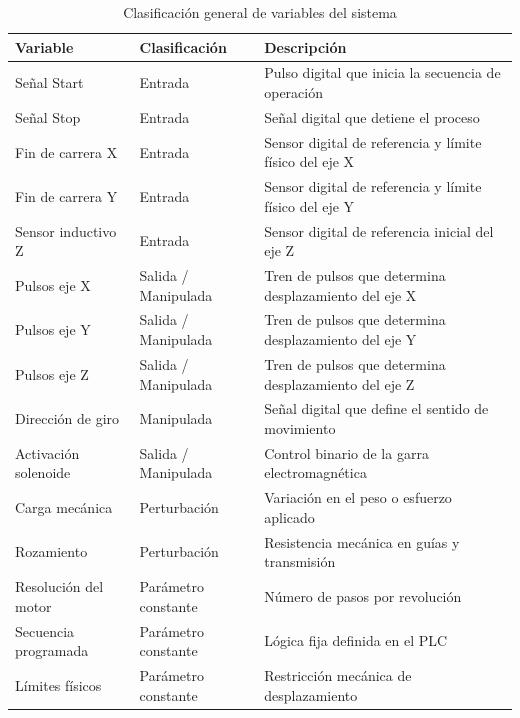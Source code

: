 \documentclass[a4paper,12pt]{article}
\begin{document}
\begin{table}[H]
\centering
\renewcommand{\arraystretch}{1.3}
\begin{tabular}{p{4cm} p{3cm} p{6cm}}
\toprule
\textbf{Variable} & \textbf{Clasificación} & \textbf{Descripción} \\
\midrule

Señal Start & Entrada & Pulso digital que inicia la secuencia de operación \\

Señal Stop & Entrada & Señal digital que detiene el proceso \\

Fin de carrera X & Entrada & Sensor digital de referencia y límite físico del eje X \\

Fin de carrera Y & Entrada & Sensor digital de referencia y límite físico del eje Y \\

Sensor inductivo Z & Entrada & Sensor digital de referencia inicial del eje Z \\

Pulsos eje X & Salida / Manipulada & Tren de pulsos que determina desplazamiento del eje X \\

Pulsos eje Y & Salida / Manipulada & Tren de pulsos que determina desplazamiento del eje Y \\

Pulsos eje Z & Salida / Manipulada & Tren de pulsos que determina desplazamiento del eje Z \\

Dirección de giro & Manipulada & Señal digital que define el sentido de movimiento \\

Activación solenoide & Salida / Manipulada & Control binario de la garra electromagnética \\

Carga mecánica & Perturbación & Variación en el peso o esfuerzo aplicado \\

Rozamiento & Perturbación & Resistencia mecánica en guías y transmisión \\

Resolución del motor & Parámetro constante & Número de pasos por revolución \\

Secuencia programada & Parámetro constante & Lógica fija definida en el PLC \\

Límites físicos & Parámetro constante & Restricción mecánica de desplazamiento \\

\bottomrule
\end{tabular}
\caption{Clasificación general de variables del sistema}
\end{table}
\end{document}
